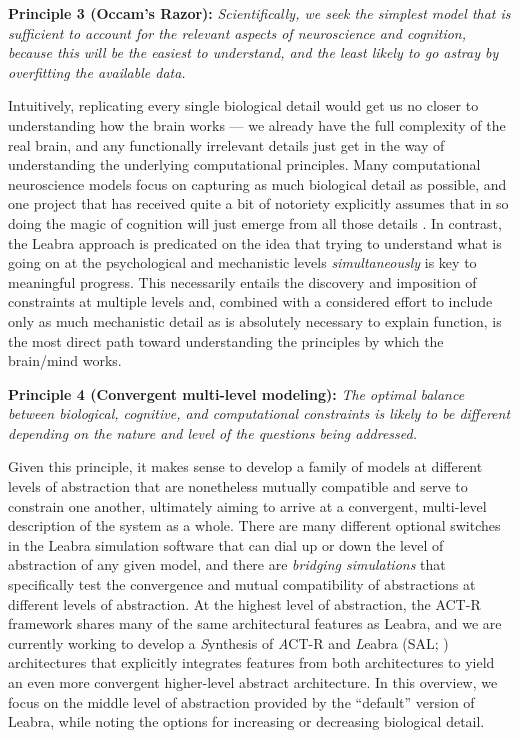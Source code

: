 \documentclass[11pt,twoside]{article}
\begin{document}
{\bf Principle 3 (Occam's Razor):} {\em Scientifically, we seek the simplest
  model that is sufficient to account for the relevant aspects of neuroscience
  and cognition, because this will be the easiest to understand, and the least
  likely to go astray by overfitting the available data.}

Intuitively, replicating every single biological detail would get us no closer
to understanding how the brain works --- we already have the full complexity
of the real brain, and any functionally irrelevant details just get in the way
of understanding the underlying computational principles.  Many computational
neuroscience models focus on capturing as much biological detail as possible,
and one project that has received quite a bit of notoriety explicitly assumes
that in so doing the magic of cognition will just emerge from all those
details \cite{Markram06}.  In contrast, the Leabra approach is
predicated on the idea that trying to understand what is going on at
the psychological and mechanistic levels {\em simultaneously} is key to
meaningful progress. This necessarily entails the discovery and imposition of
constraints at multiple levels and, combined with a considered effort to
include only as much mechanistic detail as is absolutely necessary to explain
function, is the most direct path toward understanding the principles by which
the brain/mind works.

{\bf Principle 4 (Convergent multi-level modeling):} {\em The optimal balance
  between biological, cognitive, and computational constraints is likely to be
  different depending on the nature and level of the questions being
  addressed.}  

Given this principle, it makes sense to develop a family of models at
different levels of abstraction that are nonetheless mutually compatible and
serve to constrain one another, ultimately aiming to arrive at a convergent,
multi-level description of the system as a whole.  There are many different
optional switches in the Leabra simulation software that can dial up or down
the level of abstraction of any given model, and there are {\em bridging
  simulations} that specifically test the convergence and mutual compatibility
of abstractions at different levels of abstraction.  At the highest level of
abstraction, the ACT-R framework shares many of the same architectural
features as Leabra, and we are currently working to develop a {\em S}ynthesis
of {\em A}CT-R and {\em L}eabra (SAL; )
architectures that explicitly integrates features from both architectures to
yield an even more convergent higher-level abstract architecture.  In this
overview, we focus on the middle level of abstraction provided by the
``default'' version of Leabra, while noting the options for increasing or
decreasing biological detail.
\end{document}
